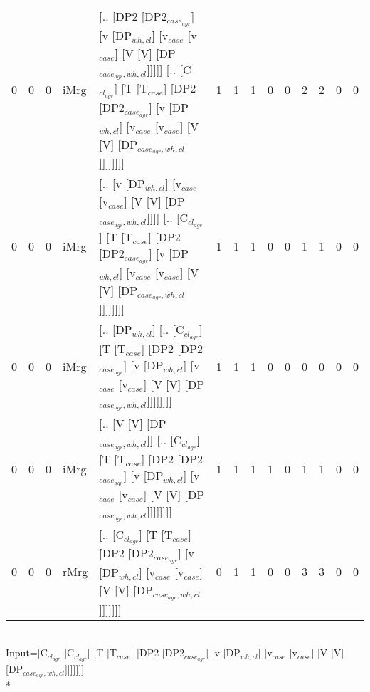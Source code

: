 \begin{tabularx}{\linewidth}{rrrlXrrrrrrrrr}
   0 &       0 &   0 & iMrg & [.. [DP2 [DP2$_{case_{agr}}$] [v [DP$_{wh,cl}$] [v$_{case}$ [v$_{case}$] [V [V] [DP$_{case_{agr},wh,cl}$]]]]] [.. [C$_{cl_{agr}}$] [T [T$_{case}$] [DP2 [DP2$_{case_{agr}}$] [v [DP$_{wh,cl}$] [v$_{case}$ [v$_{case}$] [V [V] [DP$_{case_{agr},wh,cl}$]]]]]]]]              &            1 &             1 &             1 &                  0 &                0 &           2 &           2 &              0 &              0 \\
   0 &       0 &   0 & iMrg & [.. [v [DP$_{wh,cl}$] [v$_{case}$ [v$_{case}$] [V [V] [DP$_{case_{agr},wh,cl}$]]]] [.. [C$_{cl_{agr}}$] [T [T$_{case}$] [DP2 [DP2$_{case_{agr}}$] [v [DP$_{wh,cl}$] [v$_{case}$ [v$_{case}$] [V [V] [DP$_{case_{agr},wh,cl}$]]]]]]]]                                   &            1 &             1 &             1 &                  0 &                0 &           1 &           1 &              0 &              0 \\
   0 &       0 &   0 & iMrg & [.. [DP$_{wh,cl}$] [.. [C$_{cl_{agr}}$] [T [T$_{case}$] [DP2 [DP2$_{case_{agr}}$] [v [DP$_{wh,cl}$] [v$_{case}$ [v$_{case}$] [V [V] [DP$_{case_{agr},wh,cl}$]]]]]]]]                                                                                     &            1 &             1 &             1 &                  0 &                0 &           0 &           0 &              0 &              0 \\
   0 &       0 &   0 & iMrg & [.. [V [V] [DP$_{case_{agr},wh,cl}$]] [.. [C$_{cl_{agr}}$] [T [T$_{case}$] [DP2 [DP2$_{case_{agr}}$] [v [DP$_{wh,cl}$] [v$_{case}$ [v$_{case}$] [V [V] [DP$_{case_{agr},wh,cl}$]]]]]]]]                                                                    &            1 &             1 &             1 &                  1 &                0 &           1 &           1 &              0 &              0 \\
   0 &       0 &   0 & rMrg & [.. [C$_{cl_{agr}}$] [T [T$_{case}$] [DP2 [DP2$_{case_{agr}}$] [v [DP$_{wh,cl}$] [v$_{case}$ [v$_{case}$] [V [V] [DP$_{case_{agr},wh,cl}$]]]]]]]                                                                                                     &            0 &             1 &             1 &                  0 &                0 &           3 &           3 &              0 &              0 \\
\hline
\end{tabularx}\endgroup\\
\begingroup\scriptsize Input=[C$_{cl_{agr}}$ [C$_{cl_{agr}}$] [T [T$_{case}$] [DP2 [DP2$_{case_{agr}}$] [v [DP$_{wh,cl}$] [v$_{case}$ [v$_{case}$] [V [V] [DP$_{case_{agr},wh,cl}$]]]]]]]\\*
